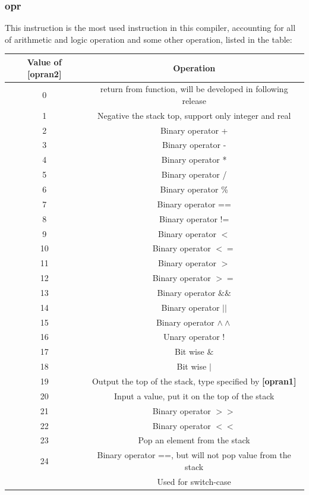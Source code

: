 \documentclass{article}
\begin{document}
		\subsubsection{opr}
		\hypertarget{4.3.2}{}
		This instruction is the most used instruction in this compiler, accounting for all of arithmetic and logic operation and some other operation, listed in the table:\\
		\begin{center}
			\begin{tabular}{cc}
			\toprule
			Value of \textbf{[opran2]} & Operation \\
			\midrule
			0 & return from function, will be developed in following release\\
			1 & Negative the stack top, support only integer and real\\
			2 & Binary operator + \\
			3 & Binary operator - \\
			4 & Binary operator * \\
			5 & Binary operator / \\
			6 & Binary operator \% \\
			7 & Binary operator == \\
			8 & Binary operator != \\
			9 & Binary operator $ < $ \\
			10 & Binary operator $ <= $ \\
			11 & Binary operator $ > $ \\
			12 & Binary operator $ >= $ \\
			13 & Binary operator $ \&\& $ \\
			14 & Binary operator $ || $ \\
			15 & Binary operator $ \wedge\wedge $ \\
			16 & Unary operator ! \\
			17 & Bit wise $ \& $\\
			18 & Bit wise $ | $\\
			19 & Output the top of the stack, type specified by \textbf{[opran1]}\\
			20 & Input a value, put it on the top of the stack\\
			21 & Binary operator $ >> $ \\
			22 & Binary operator $ << $ \\
			23 & Pop an element from the stack\\
			24 & Binary operator ==, but will not pop value from the stack\\
			   & Used for switch-case\\
			\bottomrule
			\end{tabular}
			\end{center}
\end{document}
